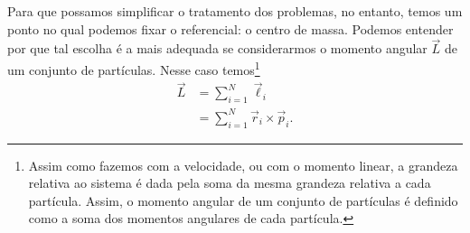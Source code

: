 Para que possamos simplificar o tratamento dos problemas, no entanto, temos um ponto no qual podemos fixar o referencial: o centro de massa. Podemos entender por que tal escolha é a mais adequada se considerarmos o momento angular $\vec{L}$ de um conjunto de partículas. Nesse caso temos\footnote{Assim como fazemos com a velocidade, ou com o momento linear, a grandeza relativa ao sistema é dada pela soma da mesma grandeza relativa a cada partícula. Assim, o momento angular de um conjunto de partículas é definido como a soma dos momentos angulares de cada partícula.}
\begin{align}
    \vec{L} &= \sum_{i=1}^N \vec{\ell}_i \\
    &= \sum_{i=1}^N \vec{r}_i \times \vec{p}_i.
\end{align}

\begin{marginfigure}
\centering
{}
\caption{Posições de duas partículas dadas em relação à origem $O$. Note que o produto vetorial determina um momento angular que entra na página para a partícula 1, e um que sai da página para a partícula 2 (não mostramos tais vetores). \label{Fig:ParticulasPosicao}}
\end{marginfigure}

\begin{marginfigure}
\centering
{}
\caption{Podemos reescrever os vetores posição das partículas 1 e 2 da Figura~\ref{Fig:ParticulasPosicao} utilizando o vetor posição do centro de massa. Nesse caso temos que $\vec{r}_1 = \vec{r}_{\rm{CM}} + \vec{r}'_1$ e $\vec{r}_2 = \vec{r}_{\rm{CM}} + \vec{r}'_2$.\label{Fig:ParticulasPosicaoCM}}
\end{marginfigure}

